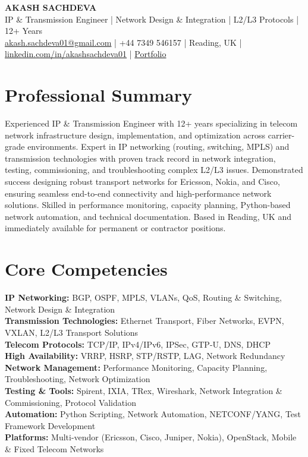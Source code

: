 \documentclass[10pt,a4paper]{article}
\begin{document}
\begin{center}
    {\LARGE \textbf{AKASH SACHDEVA}}\\[4pt]
    IP \& Transmission Engineer | Network Design \& Integration | L2/L3 Protocols | 12+ Years\\[2pt]
    \href{mailto:akash.sachdeva01@gmail.com}{akash.sachdeva01@gmail.com} | 
    +44 7349 546157 | 
    Reading, UK | 
    \href{https://linkedin.com/in/akashsachdeva01}{linkedin.com/in/akashsachdeva01} | 
    \href{https://akashsachdeva01.github.io/portfolio/}{Portfolio}
\end{center}

\vspace{6pt}

\section*{Professional Summary}
Experienced IP \& Transmission Engineer with 12+ years specializing in telecom network infrastructure design, implementation, and optimization across carrier-grade environments. Expert in IP networking (routing, switching, MPLS) and transmission technologies with proven track record in network integration, testing, commissioning, and troubleshooting complex L2/L3 issues. Demonstrated success designing robust transport networks for Ericsson, Nokia, and Cisco, ensuring seamless end-to-end connectivity and high-performance network solutions. Skilled in performance monitoring, capacity planning, Python-based network automation, and technical documentation. Based in Reading, UK and immediately available for permanent or contractor positions.

\vspace{2pt}

\section*{Core Competencies}
\textbf{IP Networking:} BGP, OSPF, MPLS, VLANs, QoS, Routing \& Switching, Network Design \& Integration\\
\textbf{Transmission Technologies:} Ethernet Transport, Fiber Networks, EVPN, VXLAN, L2/L3 Transport Solutions\\
\textbf{Telecom Protocols:} TCP/IP, IPv4/IPv6, IPSec, GTP-U, DNS, DHCP\\
\textbf{High Availability:} VRRP, HSRP, STP/RSTP, LAG, Network Redundancy\\
\textbf{Network Management:} Performance Monitoring, Capacity Planning, Troubleshooting, Network Optimization\\
\textbf{Testing \& Tools:} Spirent, IXIA, TRex, Wireshark, Network Integration \& Commissioning, Protocol Validation\\
\textbf{Automation:} Python Scripting, Network Automation, NETCONF/YANG, Test Framework Development\\
\textbf{Platforms:} Multi-vendor (Ericsson, Cisco, Juniper, Nokia), OpenStack, Mobile \& Fixed Telecom Networks
\end{document}
